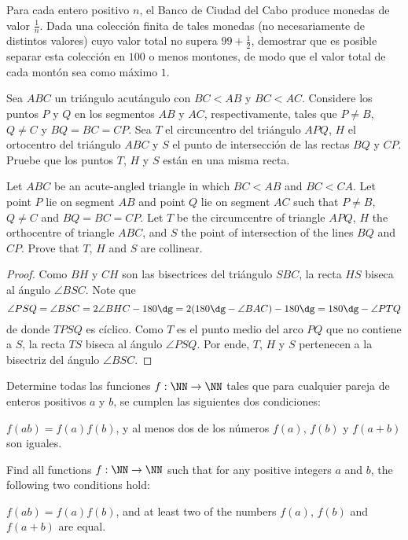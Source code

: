 \begin{problem}
	Para cada entero positivo $n$, el Banco de Ciudad del Cabo produce monedas de valor $\frac1n$. Dada una colección finita de tales monedas (no necesariamente de distintos valores) cuyo valor total no supera $99+\frac12$, demostrar que es posible separar esta colección en $100$ o menos montones, de modo que el valor total de cada montón sea como máximo $1$.
\end{problem}


\begin{probEG}[EGMO 2022/1]
	Sea $ABC$ un triángulo acutángulo con $BC<AB$ y $BC<AC$. Considere los puntos $P$ y $Q$ en los segmentos $AB$ y $AC$, respectivamente, tales que $P\ne B$, $Q\ne C$ y $BQ=BC=CP$. Sea $T$ el circuncentro del triángulo $APQ$, $H$ el ortocentro del triángulo $ABC$ y $S$ el punto de intersección de las rectas $BQ$ y $CP$. Pruebe que los puntos $T$, $H$ y $S$ están en una misma recta.
	\begin{hint}
		Let $ABC$ be an acute-angled triangle in which $BC<AB$ and $BC<CA$. Let point $P$ lie on segment $AB$ and point $Q$ lie on segment $AC$ such that $P\ne B$, $Q\ne C$ and $BQ=BC=CP$. Let $T$ be the circumcentre of triangle $APQ$, $H$ the orthocentre of triangle $ABC$, and $S$ the point of intersection of the lines $BQ$ and $CP$. Prove that $T$, $H$ and $S$ are collinear.
	\end{hint}
\end{probEG}

\begin{proof}
	Como $BH$ y $CH$ son las bisectrices del triángulo $SBC$, la recta $HS$ biseca al ángulo $\angle BSC$. Note que
	\[\angle PSQ=\angle BSC=2\angle BHC-180\dg=2(180\dg-\angle BAC)-180\dg=180\dg-\angle PTQ\]
	de donde $TPSQ$ es cíclico. Como $T$ es el punto medio del arco $PQ$ que no contiene a $S$, la recta $TS$ biseca al ángulo $\angle PSQ$. Por ende, $T$, $H$ y $S$ pertenecen a la bisectriz del ángulo $\angle BSC$.
\end{proof}

\begin{probMG}[EGMO 2022/2]
	Determine todas las funciones $f:\NN\to\NN$ tales que para cualquier pareja de enteros positivos $a$ y $b$, se cumplen las siguientes dos condiciones:
	\begin{enumerate}[(1)]
		\ii $f(ab)=f(a)f(b)$, y
		\ii al menos dos de los números $f(a)$, $f(b)$ y $f(a+b)$ son iguales.
	\end{enumerate}
	\begin{hint}
		Find all functions $f:\NN\to\NN$ such that for any positive integers $a$ and $b$, the following two conditions hold:
		\begin{enumerate}[(1)]
			\ii $f(ab)=f(a)f(b)$, and
			\ii at least two of the numbers $f(a)$, $f(b)$ and $f(a+b)$ are equal.
		\end{enumerate}
	\end{hint}
\end{probMG}

